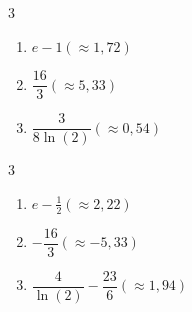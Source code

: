 \documentclass[a4paper, 12pt]{article}
\begin{document}
\begin{facit}
    \begin{multicols}{3}
        \begin{enumerate}
            \item $e-1 \left(\approx1,72\right)$
            \item $\dfrac {16}3 \left(\approx5,33\right)$
            \item $\dfrac 3{8 \ln(2)} \left(\approx0,54\right)$
        \end{enumerate}
    \end{multicols}
\end{facit}

\begin{facit}
    \begin{multicols}{3}
        \begin{enumerate}
            \item $e-\frac12 \left(\approx2,22\right)$
            \item $-\dfrac {16}3 \left(\approx-5,33\right)$
            \item $\dfrac 4{\ln(2)} - \dfrac {23}6 \left(\approx1,94\right)$
        \end{enumerate}
    \end{multicols}
\end{facit}
\end{document}
